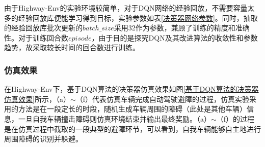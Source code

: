 由于Highway-Env的实验环境较简单，对于DQN网络的经验回放，不需要容量太多的经验回放库便能学习得到目标，实验参数如表\ref{决策器网络参数}。同时，抽取的经验回放库批次更新的$batch\_size$采用32作为参数，兼顾了训练的精度和准确性。对于训练回合数$episode$，由于目的是探究DQN及其改进算法的收敛性和参数趋势，故采取较长时间的回合数进行训练。

\subsubsection{仿真效果}

在Highway-Env下，基于DQN算法的决策器仿真效果如图\ref{基于DQN算法的决策器仿真效果}所示，（a）$\sim$（f）代表仿真车辆完成自动驾驶避障的过程，仿真实验采用的方法是在一段定长的时段，随机生成车辆周围的障碍（此处是其他车辆）信息，一旦自我车辆撞击障碍则仿真环境结束并输出最终奖励。（a）$\sim$（f）的过程是在仿真过程中截取的一段典型的避障环节，可以看到，自我车辆能够自主地进行周围障碍的识别并躲避。

